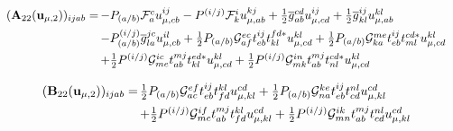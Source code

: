 \begin{subappendices}
\begin{equation}
    \begin{array}{r@{\,}l}
        (\mathbf{A}_{22}(\mathbf{u}_{\mu,2}))_{ijab}
        =
        &
        -
        P_{(a/b)}
        \mathcal{F}_a^c
        u_{\mu,cb}^{ij}
        -
        P^{(i/j)}
        \mathcal{F}_k^i
        u_{\mu,ab}^{kj}
        +
        \tfrac{1}{2}
        \overline{g}_{ab}^{cd}
        u_{\mu,cd}^{ij}
        +
        \tfrac{1}{2}
        \overline{g}_{kl}^{ij}
        u_{\mu,ab}^{kl}
        \\[5pt]
        &
        -
        P_{(a/b)}^{(i/j)}
        \overline{g}_{la}^{jc}
        u_{\mu,cb}^{il}
        +
        \tfrac{1}{2}
        P_{(a/b)}
        \mathcal{G}_{af}^{ec}
        t_{eb}^{ij}
        t_{kl}^{fd*}
        u_{\mu,cd}^{kl}
        +
        \tfrac{1}{2}
        P_{(a/b)}
        \mathcal{G}_{ka}^{me}
        t_{eb}^{ij}
        t_{ml}^{cd*}
        u_{\mu,cd}^{kl}
        \\[5pt]
        &
        +
        \tfrac{1}{2}
        P^{(i/j)}
        \mathcal{G}_{me}^{ic}
        t_{ab}^{mj}
        t_{kl}^{ed*}
        u_{\mu,cd}^{kl}
        +
        \tfrac{1}{2}
        P^{(i/j)}
        \mathcal{G}_{mk}^{in}
        t_{ab}^{mj}
        t_{nl}^{cd*}
        u_{\mu,cd}^{kl}
    \end{array}
\end{equation}

\begin{equation}
    \begin{array}{r@{\,}l}
        (\mathbf{B}_{22}(\mathbf{u}_{\mu,2}))_{ijab}
        =
        &
        \tfrac{1}{2}
        P_{(a/b)}
        \mathcal{G}_{ac}^{ef}
        t_{eb}^{ij}
        t_{fd}^{kl}
        u_{\mu,kl}^{cd}
        +
        \tfrac{1}{2}
        P_{(a/b)}
        \mathcal{G}_{na}^{ke}
        t_{eb}^{ij}
        t_{cd}^{nl}
        u_{\mu,kl}^{cd}
        \\[5pt]
        &
        +
        \tfrac{1}{2}
        P^{(i/j)}
        \mathcal{G}_{mc}^{if}
        t_{ab}^{mj}
        t_{fd}^{kl}
        u_{\mu,kl}^{cd}
        +
        \tfrac{1}{2}
        P^{(i/j)}
        \mathcal{G}_{mn}^{ik}
        t_{ab}^{mj}
        t_{cd}^{nl}
        u_{\mu,kl}^{cd}
    \end{array}
\end{equation}


\end{subappendices}
